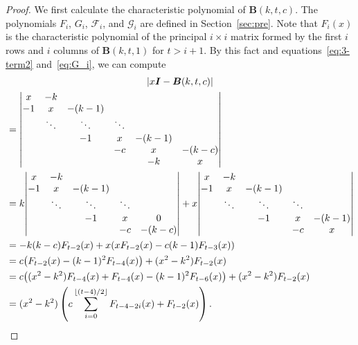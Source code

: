 \documentclass[ALCO,ThmDefs,Unicode,epreuves]{cedram}
\begin{document}
\begin{proof}
We first calculate 
the characteristic polynomial of $\boldsymbol{B}(k,t,c)$. 
The polynomials $F_i$, $G_i$, $\mathscr{F}_i$, and $\mathscr{G}_i$ are defined in Section~\ref{sec:pre}. 
Note that $F_i(x)$ is the characteristic polynomial of the principal $i \times i$ matrix formed by the first 
$i$ rows and $i$ columns of $\boldsymbol{B}(k,t,1)$ for $t>i+1$. 
By this fact and equations~\eqref{eq:3-term2} and~\eqref{eq:G_i}, we can compute 
\begin{multline*}
|x \boldsymbol{I}-\boldsymbol{B}(k,t,c)|\\
\begin{aligned}
&={%
\begin{vmatrix}
x & -k & & & & \\
-1 & x & -(k-1) & & & \\
 & \ddots & \ddots & \ddots & & \\
 & &-1 & x & -(k-1)& \\
 & & & -c & x & -(k-c) \\
 & & & & -k & x 
\end{vmatrix}}\\
&=k {%
\begin{vmatrix}
x & -k & & & \\
-1 & x & -(k-1) & & \\
 & \ddots & \ddots & \ddots & \\
 & &-1 & x & 0 \\
 & & & -c & -(k-c) \\ 
\end{vmatrix}}+x{%
\begin{vmatrix}
x & -k & & & \\
-1 & x & -(k-1) & & \\
 & \ddots & \ddots & \ddots & \\
 & &-1 & x & -(k-1) \\
 & & & -c & x 
\end{vmatrix}}\\
&=-k(k-c)F_{t-2}(x)+x(x F_{t-2}(x)-c(k-1)F_{t-3}(x))\\
&= c\big(F_{t-2}(x)-(k-1)^2 F_{t-4}(x)\big)+(x^2-k^2)F_{t-2}(x)\\
&= c\big((x^2-k^2)F_{t-4}(x)+F_{t-4}(x)-(k-1)^2 F_{t-6}(x)\big)+(x^2-k^2)F_{t-2}(x)\\
&= (x^2-k^2)\left(c\sum_{i=0}^{ \lfloor (t-4)/2 \rfloor}F_{t-4-2i}(x)+F_{t-2}(x)\right).

\end{aligned}
\end{multline*}
\end{proof}
\end{document}
